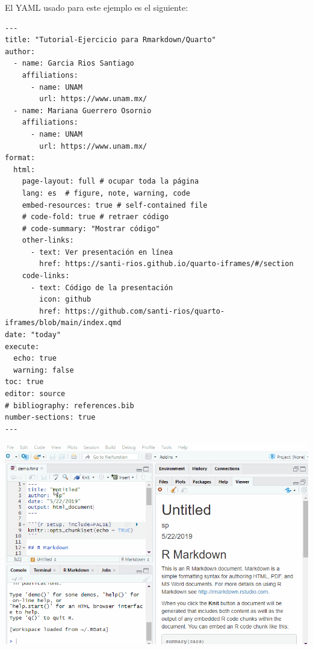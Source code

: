 \documentclass[
  letterpaper,
  DIV=11,
  numbers=noendperiod]{scrartcl}
\begin{document}
\begin{tcolorbox}[enhanced jigsaw, colbacktitle=quarto-callout-tip-color!10!white, opacitybacktitle=0.6, bottomrule=.15mm, colframe=quarto-callout-tip-color-frame, opacityback=0, toptitle=1mm, breakable, toprule=.15mm, left=2mm, bottomtitle=1mm, leftrule=.75mm, arc=.35mm, title=\textcolor{quarto-callout-tip-color}{\faLightbulb}\hspace{0.5em}{Tip}, titlerule=0mm, rightrule=.15mm, coltitle=black, colback=white]

El YAML usado para este ejemplo es el siguiente:

\begin{verbatim}
---
title: "Tutorial-Ejercicio para Rmarkdown/Quarto"
author:
  - name: Garcia Rios Santiago
    affiliations:
      - name: UNAM
        url: https://www.unam.mx/
  - name: Mariana Guerrero Osornio
    affiliations:
      - name: UNAM
        url: https://www.unam.mx/
format: 
  html:
    page-layout: full # ocupar toda la página
    lang: es  # figure, note, warning, code
    embed-resources: true # self-contained file
    # code-fold: true # retraer código
    # code-summary: "Mostrar código"
    other-links:
      - text: Ver presentación en línea
        href: https://santi-rios.github.io/quarto-iframes/#/section
    code-links:
      - text: Código de la presentación
        icon: github
        href: https://github.com/santi-rios/quarto-iframes/blob/main/index.qmd
date: "today"
execute:
  echo: true  
  warning: false
toc: true
editor: source
# bibliography: references.bib  
number-sections: true
---
\end{verbatim}

\end{tcolorbox}

\includegraphics{./figuras/style-markdown.gif}
\end{document}
